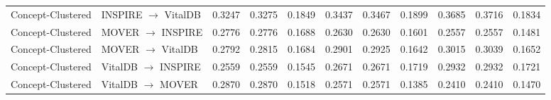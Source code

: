 \begin{table}[!t]
\begin{tabular}{llrrrrrrrrr}
Concept-Clustered & INSPIRE $\rightarrow$ VitalDB & 0.3247 & 0.3275 & 0.1849 & 0.3437 & 0.3467 & 0.1899 & 0.3685 & 0.3716 & 0.1834 \\
Concept-Clustered & MOVER $\rightarrow$ INSPIRE & 0.2776 & 0.2776 & 0.1688 & 0.2630 & 0.2630 & 0.1601 & 0.2557 & 0.2557 & 0.1481 \\
Concept-Clustered & MOVER $\rightarrow$ VitalDB & 0.2792 & 0.2815 & 0.1684 & 0.2901 & 0.2925 & 0.1642 & 0.3015 & 0.3039 & 0.1652 \\
Concept-Clustered & VitalDB $\rightarrow$ INSPIRE & 0.2559 & 0.2559 & 0.1545 & 0.2671 & 0.2671 & 0.1719 & 0.2932 & 0.2932 & 0.1721 \\
Concept-Clustered & VitalDB $\rightarrow$ MOVER & 0.2870 & 0.2870 & 0.1518 & 0.2571 & 0.2571 & 0.1385 & 0.2410 & 0.2410 & 0.1470 \\
\bottomrule
\end{tabular}
\end{table}
